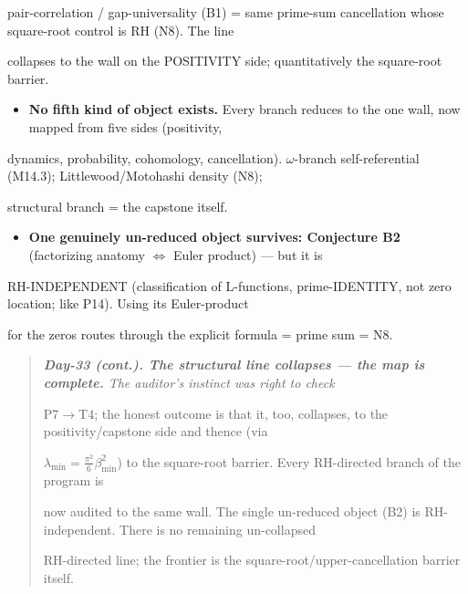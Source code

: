 \documentclass[10pt]{article}
\begin{document}
  pair-correlation / gap-universality (B1) = same prime-sum cancellation whose square-root control is RH (N8). The line\par
  collapses to the wall on the POSITIVITY side; quantitatively the square-root barrier.\par
\begin{itemize}
\item \textbf{No fifth kind of object exists.} Every branch reduces to the one wall, now mapped from five sides (positivity,
\end{itemize}
  dynamics, probability, cohomology, cancellation). \ensuremath{\omega}-branch self-referential (M14.3); Littlewood/Motohashi density (N8);\par
  structural branch = the capstone itself.\par
\begin{itemize}
\item \textbf{One genuinely un-reduced object survives: Conjecture B2} (factorizing anatomy \ensuremath{\iff} Euler product) --- but it is
\end{itemize}
  RH-INDEPENDENT (classification of L-functions, prime-IDENTITY, not zero location; like P14). Using its Euler-product\par
  for the zeros routes through the explicit formula = prime sum = N8.\par

\begin{quote}\itshape
\textbf{Day-33 (cont.). The structural line collapses --- the map is complete.} The auditor's instinct was right to check\par
P7\ensuremath{\to}T4; the honest outcome is that it, too, collapses, to the positivity/capstone side and thence (via\par
$\lambda_{\min}=\tfrac{\pi^2}6\beta_{\min}^2$) to the square-root barrier. Every RH-directed branch of the program is\par
now audited to the same wall. The single un-reduced object (B2) is RH-independent. There is no remaining un-collapsed\par
RH-directed line; the frontier is the square-root/upper-cancellation barrier itself.\par
\end{quote}
\end{document}
